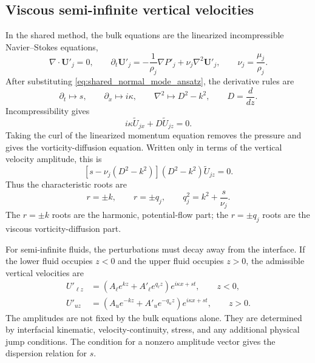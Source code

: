 \documentclass[11pt,a4paper]{article}
\begin{document}
\subsection{Viscous semi-infinite vertical velocities}

In the shared method, the bulk equations are the linearized incompressible Navier--Stokes equations,
\begin{equation}
    \nabla\cdot \bm{U}'_j=0,
    \qquad
    \partial_t\bm{U}'_j
    =
    -\frac{1}{\rho_j}\nabla P'_j
    +
    \nu_j\nabla^2\bm{U}'_j,
    \qquad
    \nu_j=\frac{\mu_j}{\rho_j}.
    \label{eq:shared_linear_ns}
\end{equation}
After substituting \eqref{eq:shared_normal_mode_ansatz}, the derivative rules are
\begin{equation}
    \partial_t\mapsto s,
    \qquad
    \partial_x\mapsto i\kappa,
    \qquad
    \nabla^2\mapsto D^2-k^2,
    \qquad
    D=\frac{d}{dz}.
\end{equation}
Incompressibility gives
\begin{equation}
    i\kappa \widetilde{U}_{jx}+D\widetilde{U}_{jz}=0.
\end{equation}
Taking the curl of the linearized momentum equation removes the pressure and gives the vorticity-diffusion equation.  Written only in terms of the vertical velocity amplitude, this is
\begin{equation}
    \left[s-\nu_j(D^2-k^2)\right](D^2-k^2)\widetilde{U}_{jz}=0.
    \label{eq:shared_viscous_vertical_ode}
\end{equation}
Thus the characteristic roots are
\begin{equation}
    r=\pm k,
    \qquad
    r=\pm q_j,
    \qquad
    q_j^2=k^2+\frac{s}{\nu_j}.
    \label{eq:shared_q_definition}
\end{equation}
The $r=\pm k$ roots are the harmonic, potential-flow part; the $r=\pm q_j$ roots are the viscous vorticity-diffusion part.

For semi-infinite fluids, the perturbations must decay away from the interface.  If the lower fluid occupies $z<0$ and the upper fluid occupies $z>0$, the admissible vertical velocities are
\begin{align}
    U'_{\ell z}
    &=
    \left(
    A_{\ell}e^{kz}
    +
    A'_{\ell}e^{q_{\ell}z}
    \right)e^{i\kappa x+st},
    \qquad z<0,
    \label{eq:shared_lower_velocity}\\
    U'_{u z}
    &=
    \left(
    A_{u}e^{-kz}
    +
    A'_{u}e^{-q_{u}z}
    \right)e^{i\kappa x+st},
    \qquad z>0.
    \label{eq:shared_upper_velocity}
\end{align}
The amplitudes are not fixed by the bulk equations alone.  They are determined by interfacial kinematic, velocity-continuity, stress, and any additional physical jump conditions.  The condition for a nonzero amplitude vector gives the dispersion relation for $s$.
\end{document}
